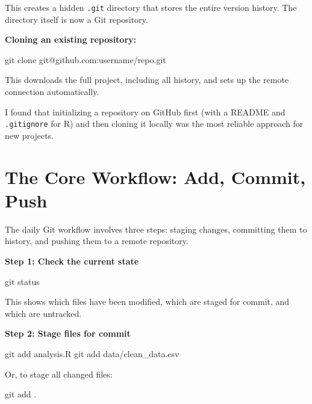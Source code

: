 \documentclass[
  letterpaper,
  DIV=11,
  numbers=noendperiod]{scrartcl}
\newenvironment{Shaded}{\begin{snugshade}}{\end{snugshade}}
\newcommand{\FunctionTok}[1]{\textcolor[rgb]{0.28,0.35,0.67}{#1}}
\newcommand{\NormalTok}[1]{\textcolor[rgb]{0.00,0.23,0.31}{#1}}
\begin{document}
This creates a hidden \texttt{.git} directory that stores the entire
version history. The directory itself is now a Git repository.

\textbf{Cloning an existing repository:}

\begin{Shaded}
\begin{Highlighting}[]
\FunctionTok{git}\NormalTok{ clone git@github.com:username/repo.git}
\end{Highlighting}
\end{Shaded}

This downloads the full project, including all history, and sets up the
remote connection automatically.

I found that initializing a repository on GitHub first (with a README
and \texttt{.gitignore} for R) and then cloning it locally was the most
reliable approach for new projects.

\section{The Core Workflow: Add, Commit,
Push}\label{the-core-workflow-add-commit-push}

The daily Git workflow involves three steps: staging changes, committing
them to history, and pushing them to a remote repository.

\textbf{Step 1: Check the current state}

\begin{Shaded}
\begin{Highlighting}[]
\FunctionTok{git}\NormalTok{ status}
\end{Highlighting}
\end{Shaded}

This shows which files have been modified, which are staged for commit,
and which are untracked.

\textbf{Step 2: Stage files for commit}

\begin{Shaded}
\begin{Highlighting}[]
\FunctionTok{git}\NormalTok{ add analysis.R}
\FunctionTok{git}\NormalTok{ add data/clean\_data.csv}
\end{Highlighting}
\end{Shaded}

Or, to stage all changed files:

\begin{Shaded}
\begin{Highlighting}[]
\FunctionTok{git}\NormalTok{ add .}
\end{Highlighting}
\end{Shaded}
\end{document}
